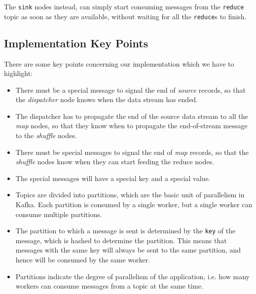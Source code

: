 The \texttt{sink} nodes instead, can simply start consuming messages from the \texttt{reduce} topic as soon as they are available, without waiting for all the \texttt{reduce}s to finish.

\subsection{Implementation Key Points}

There are some key points concerning our implementation which we have to highlight:
\begin{itemize}
   \item There must be a special message to signal the end of \textit{source} records, so that the \textit{dispatcher} node knows when the data stream has ended.
   \item The dispatcher has to propagate the end of the source data stream to all the \textit{map} nodes, so that they know when to propagate the end-of-stream message to the \textit{shuffle} nodes.
   \item There must be special messages to signal the end of \textit{map} records, so that the \textit{shuffle} nodes know when they can start feeding the reduce nodes.
   \item The special messages will have a special key and a special value.
   \item Topics are divided into partitions, which are the basic unit of parallelism in Kafka. Each partition is consumed by a single worker, but a single worker can consume multiple partitions.
   \item The partition to which a message is sent is determined by the \texttt{key} of the message, which is hashed to determine the partition. This means that messages with the same key will always be sent to the same partition, and hence will be consumed by the same worker.
   \item Partitions indicate the degree of parallelism of the application, i.e. how many workers can consume messages from a topic at the same time.
\end{itemize} 

